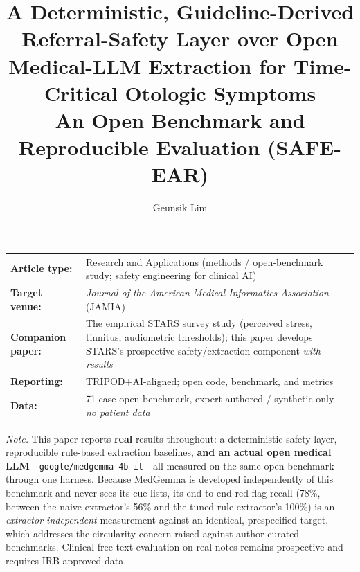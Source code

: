 \documentclass[11pt]{article}
\title{A Deterministic, Guideline-Derived Referral-Safety Layer over Open Medical-LLM Extraction for Time-Critical Otologic Symptoms\\[2pt]
\large An Open Benchmark and Reproducible Evaluation (SAFE-EAR)}
\author[1]{Geunsik Lim}
\affil[1]{Sungkyunkwan University, Republic of Korea; \texttt{leemgs@g.skku.edu}; ORCID \href{https://orcid.org/0000-0003-1845-7132}{0000-0003-1845-7132}}
\date{}
\begin{document}
\maketitle
\thispagestyle{fancy}

\begin{center}
\small
\begin{tabular}{@{}l p{}@{}}
\textbf{Article type:} & Research and Applications (methods / open-benchmark study; safety engineering for clinical AI) \\
\textbf{Target venue:} & \textit{Journal of the American Medical Informatics Association} (JAMIA) \\
\textbf{Companion paper:} & The empirical STARS survey study (perceived stress, tinnitus, audiometric thresholds); this paper develops STARS's prospective safety/extraction component \emph{with results} \\
\textbf{Reporting:} & TRIPOD+AI-aligned; open code, benchmark, and metrics \\
\textbf{Data:} & 71-case open benchmark, expert-authored / synthetic only --- \emph{no patient data} \\
\end{tabular}

\vspace{2pt}
{\footnotesize\emph{Note.} This paper reports \textbf{real} results throughout: a deterministic safety layer, reproducible rule-based extraction baselines, \textbf{and an actual open medical LLM}---\texttt{google/medgemma-4b-it}---all measured on the same open benchmark through one harness. Because MedGemma is developed independently of this benchmark and never sees its cue lists, its end-to-end red-flag recall (78\%, between the naive extractor's 56\% and the tuned rule extractor's 100\%) is an \emph{extractor-independent} measurement against an identical, prespecified target, which addresses the circularity concern raised against author-curated benchmarks. Clinical free-text evaluation on real notes remains prospective and requires IRB-approved data.}
\end{center}
\end{document}

